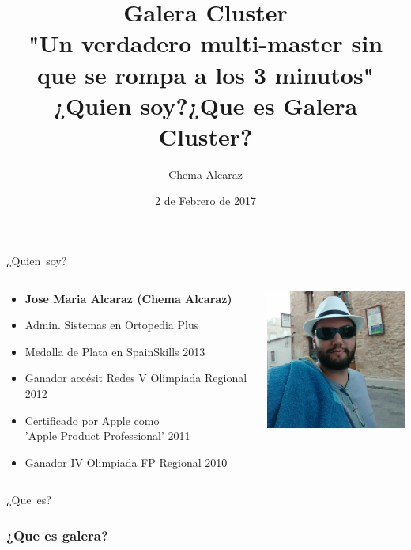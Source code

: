 \documentclass[UTF8]{beamer}
\title[Portada]{
	Galera Cluster \\
	\large "Un verdadero multi-master sin que se rompa a los 3 minutos"\\
}
\author{Chema Alcaraz}
\date{2 de Febrero de 2017}
\begin{document}
	
\begin{frame}
	\titlepage
\end{frame}

\title{¿Quien soy?}

\begin{frame}
	\centering
	\mbox{¿Quien soy?}	
\end{frame}


\begin{frame}
\begin{columns}
    \begin{column}{0.6\textwidth}
        \begin{itemize}
            \item \textbf{Jose Maria Alcaraz (Chema Alcaraz)}
            \item Admin. Sistemas en Ortopedia Plus
            \item Medalla de Plata en SpainSkills 2013
			\item Ganador accésit Redes V Olimpiada Regional 2012
			\item Certificado por Apple como \\'Apple Product Professional' 2011
            \item Ganador IV Olimpiada FP Regional 2010
        \end{itemize}
    \end{column}
    \begin{column}{0.40\textwidth}
        \includegraphics[width=5cm]{images/yo}
    \end{column}
\end{columns}
	
\end{frame}


\title{¿Que es Galera Cluster?}

\begin{frame}
	\centering
	\mbox{¿Que es?}	
\end{frame}


\begin{frame}
	\frametitle{¿Que es galera?}
\end{frame}
\end{document}
